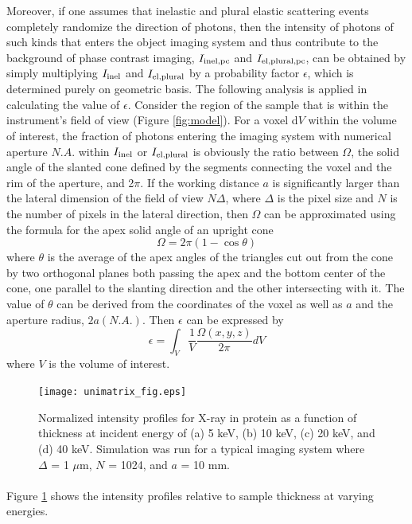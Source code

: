 \documentclass[]{article}
\newcommand\inel{\textup{\scriptsize{inel}}}
\newcommand\elpl{\textup{\scriptsize{el,plural}}}
\newcommand\inelpc{\textup{\scriptsize{inel,pc}}}
\newcommand\elplpc{\textup{\scriptsize{el,plural,pc}}}
\begin{document}
Moreover, if one assumes that inelastic and plural elastic scattering events completely randomize the direction of photons, then the intensity of photons of such kinds that enters the object imaging system and thus contribute to the background of phase contrast imaging, $I_{\inelpc}$ and $I_{\elplpc}$, can be obtained by simply multiplying $I_{\inel}$ and $I_{\elpl}$ by a probability factor $\epsilon$, which is determined purely on geometric basis. The following analysis is applied in calculating the value of $\epsilon$. Consider the region of the sample that is within the instrument's field of view (Figure \ref{fig:model}). For a voxel d$V$ within the volume of interest, the fraction of photons entering the imaging system with numerical aperture $N.A.$ within $I_{\inel}$ or $I_{\elpl}$ is obviously the ratio between $\Omega$, the solid angle of the slanted cone defined by the segments connecting the voxel and the rim of the aperture, and 2$\pi$. If the working distance $a$ is significantly larger than the lateral dimension of the field of view $N\Delta$, where $\Delta$ is the pixel size and $N$ is the number of pixels in the lateral direction, then $\Omega$ can be approximated using the formula for the apex solid angle of an upright cone
\begin{equation}
\Omega = 2\pi(1-\cos\theta)
\end{equation}
where $\theta$ is the average of the apex angles of the triangles cut out from the cone by two orthogonal planes both passing the apex and the bottom center of the cone, one parallel to the slanting direction and the other intersecting with it. The value of $\theta$ can be derived from the coordinates of the voxel as well as $a$ and the aperture radius, $2a(N.A.)$. Then $\epsilon$ can be expressed by
\begin{equation}
\epsilon = \int_V \frac{1}{V} \frac{\Omega(x,y,z)}{2\pi} dV
\end{equation}
where $V$ is the volume of interest. 

\begin{figure}[!t]
\begin{center}
\texttt{[image: unimatrix\_fig.eps]}
\caption{Normalized intensity profiles for X-ray in protein as a function of thickness at incident energy of (a) 5 keV, (b) 10 keV, (c) 20 keV, and (d) 40 keV. Simulation was run for a typical imaging system where $\Delta$ = 1 $\mu$m, $N$ = 1024, and $a$ = 10 mm.}
\label{fig:unimatrix_inten}
\end{center}
\end{figure}



\paragraph{} Figure \ref{fig:unimatrix_inten} shows the intensity profiles relative to sample thickness at varying energies. 

{}

\end{document}
